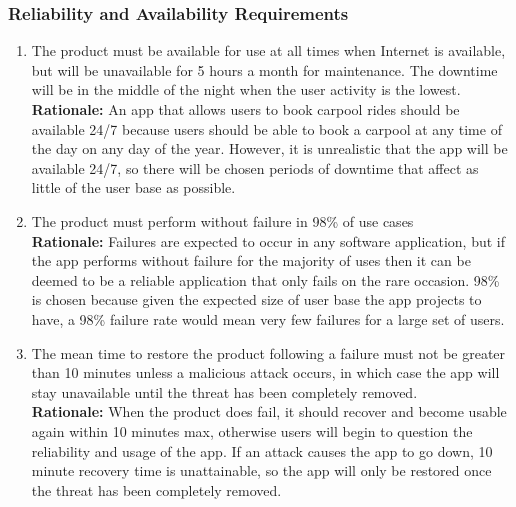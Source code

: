 \documentclass[]{article}
\begin{document}
\subsubsection{Reliability and Availability Requirements}
\label{ssub:reliability_and_availability_requirements}
\begin{enumerate}[{PR-RA}1. ]
	\item The product must be available for use at all times when Internet is available, but will be unavailable for 5 hours a month for maintenance. The downtime will be in the middle of the night when the user activity is the lowest. \\
	{\bf Rationale:} An app that allows users to book carpool rides should be available 24/7 because users should be able to book a carpool at any time of the day on any day of the year. However, it is unrealistic that the app will be available 24/7, so there will be chosen periods of downtime that affect as little of the user base as possible.
	\item The product must perform without failure in 98\% of use cases \\
	{\bf Rationale:} Failures are expected to occur in any software application, but if the app performs without failure for the majority of uses then it can be deemed to be a reliable application that only fails on the rare occasion. 98\% is chosen because given the expected size of user base the app projects to have, a 98\% failure rate would mean very few failures for a large set of users.
	\item The mean time to restore the product following a failure must not be greater than 10 minutes unless a malicious attack occurs, in which case the app will stay unavailable until the threat has been completely removed. \\
	{\bf Rationale:} When the product does fail, it should recover and become usable again within 10 minutes max, otherwise users will begin to question the reliability and usage of the app. If an attack causes the app to go down, 10 minute recovery time is unattainable, so the app will only be restored once the threat has been completely removed.
\end{enumerate}
\end{document}
